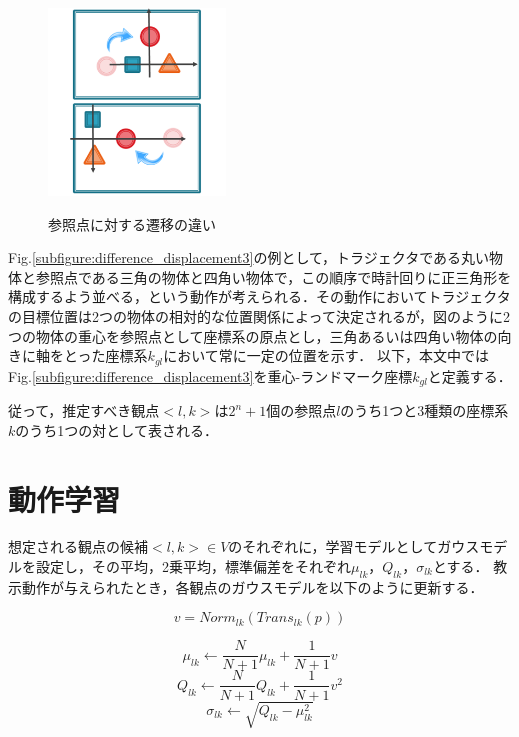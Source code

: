 \begin{figure}[h]
\begin{minipage}[t]{.3\textwidth}
		\centering
		\includegraphics[width=4.7cm]{figure2_sub_c.png} \\ %
		\label{subfigure:difference_displacement3}
	\end{minipage}
	\caption{参照点に対する遷移の違い}
	\label{figure:difference_displacement}
\end{figure}


Fig.\ref{subfigure:difference_displacement3}の例として，トラジェクタである丸い物体と参照点である三角の物体と四角い物体で，この順序で時計回りに正三角形を構成するよう並べる，という動作が考えられる．その動作においてトラジェクタの目標位置は2つの物体の相対的な位置関係によって決定されるが，図のように2つの物体の重心を参照点として座標系の原点とし，三角あるいは四角い物体の向きに軸をとった座標系$k_{gl}$において常に一定の位置を示す．
以下，本文中ではFig.\ref{subfigure:difference_displacement3}を重心-ランドマーク座標$k_{gl}$と定義する．

従って，推定すべき観点$<l , k>$は$2^{n}+1$個の参照点$l$のうち1つと3種類の座標系$k$のうち1つの対として表される．

\section{動作学習}

想定される観点の候補$<l , k>∈V$のそれぞれに，学習モデルとしてガウスモデルを設定し，その平均，2乗平均，標準偏差をそれぞれ$μ_{lk}$，$Q_{lk}$，$σ_{lk}$とする．
教示動作が与えられたとき，各観点のガウスモデルを以下のように更新する．

\begin{equation}
	v = Norm_{lk}(Trans_{lk}(p))
\end{equation}

\begin{equation}
	μ_{lk}  \leftarrow \frac{N}{N+1}μ_{lk}+\frac{1}{N+1}v
\end{equation}
\begin{equation}
	Q_{lk}  \leftarrow \frac{N}{N+1}Q_{lk}+\frac{1}{N+1}v^2	
\end{equation}
\begin{equation}
	σ_{lk}  \leftarrow \sqrt{Q_{lk} - μ_{lk}^2}
\end{equation}


